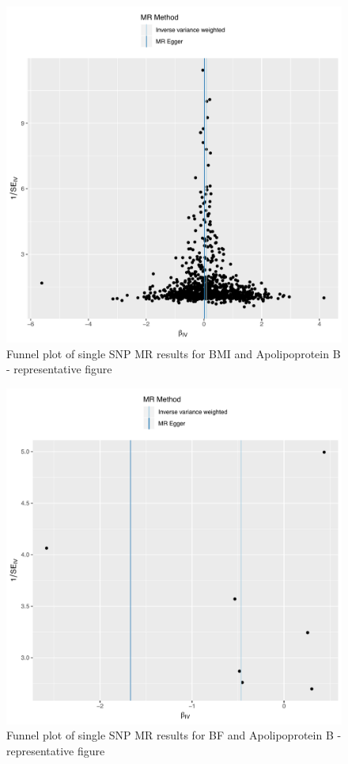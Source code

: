 \documentclass[11pt,twoside]{bristolthesis}
\begin{document}
\begin{figure}
\includegraphics[width=1\linewidth]{data/chapter5/figures/funnelplot_BMI_APOB_representative_figure} \caption{Funnel plot of single SNP MR results for BMI and Apolipoprotein B - representative figure}\label{fig:appendix-chapter5-figure-funnelplot-BMI-representative-figure}
\end{figure}
\begin{figure}
\includegraphics[width=1\linewidth]{data/chapter5/figures/funnelplot_BF_APOB_representative_figure} \caption{Funnel plot of single SNP MR results for BF and Apolipoprotein B - representative figure}\label{fig:appendix-chapter5-figure-funnelplot-BF-representative-figure}
\end{figure}
\end{document}
